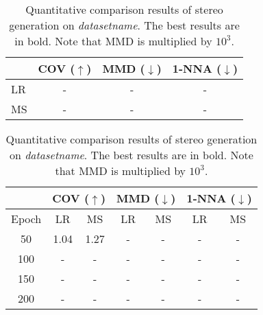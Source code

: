 
\begin{table}[t]
    \centering
    \begin{tabular}{l|c|c|c}
        \toprule
         & COV ($\uparrow$) & MMD ($\downarrow$) & 1-NNA ($\downarrow$)\\
         \midrule
         LR & - & - & - \\
         MS & - & - & - \\
         \bottomrule
         
    \end{tabular}
    \caption{Quantitative comparison results of stereo generation on \textit{datasetname}.
    	The best results are in bold.
    	Note that MMD is multiplied by $10^3$. }
    \label{table:result}
\end{table}

\begin{table}[t]
\centering
    \begin{tabular}{c|cc|cc|cc}
		\toprule
		 & \multicolumn{2}{c|}{COV ($\uparrow$)} & \multicolumn{2}{c|}{MMD ($\downarrow$)} &  \multicolumn{2}{c}{1-NNA ($\downarrow$)}\\
		\midrule
		Epoch & \multicolumn{1}{c|}{LR} & \multicolumn{1}{c|}{MS} & \multicolumn{1}{c|}{LR} & \multicolumn{1}{c|}{MS} & \multicolumn{1}{c|}{LR} & \multicolumn{1}{c}{MS} \\
		\midrule
		50&  1.04 & 1.27 & - & - & - & - \\
		100&  - & - & - & - & - & - \\
		150&  - & - & - & - & - & - \\
		200&  - & - & - & - & - & - \\
		\bottomrule
	\end{tabular}
    \caption{
    	Quantitative comparison results of stereo generation on \textit{datasetname}.
    	The best results are in bold.
    	Note that MMD is multiplied by $10^3$. 
    }
    \label{table:result}
    
\end{table}
\fi